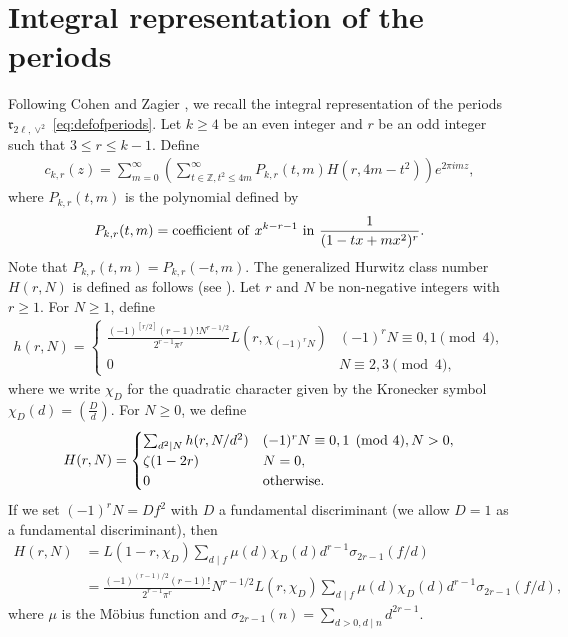 \documentclass[11pt,letterpaper,reqno]{amsart}
\numberwithin{figure}{section}
\numberwithin{table}{section}
\theoremstyle{definition}
\theoremstyle{plain}
\theoremstyle{definition}
\theoremstyle{definition}
\theoremstyle{remark}
\numberwithin{equation}{section}
\theoremstyle{remark}
\begin{document}
\section{Integral representation of the periods}\label{sect:integralrepofperiods}
Following Cohen \cite{Cohen'smodularformC_k} and Zagier \cite{Zagier1977M}, we recall the integral representation of the periods $\mathfrak{r}_{2\ell,\vee^2}$ \eqref{eq:defofperiods}. Let $k\geq4$ be an even integer and $r$ be an odd integer such that $3\leq r\leq k-1$. Define
\begin{align}
    c_{k,r}(z)=\sum_{m=0}^{\infty}\left(\sum_{t\in\mathbb{Z},t^{2}\leq4m}^{\infty}P_{k,r}(t,m)H(r,4m-t^2)\right)e^{2\pi imz},\label{eq:defofc_k,r}
\end{align}
where $P_{k,r}(t,m)$ is the polynomial defined by \cite[p.114]{Zagier1977M}
\begin{align}
    P_{k,r}(t,m)={\rm coefficient~of~}x^{k-r-1}~{\rm in~}\frac{1}{(1-tx+mx^2)^{r}}.
\end{align}
Note that $P_{k,r}(t,m)=P_{k,r}(-t,m)$.  The generalized Hurwitz class number $H(r,N)$ is defined as follows (see \cite[p.272-273]{Cohen'smodularformC_k}).  Let $r$ and $N$ be non-negative integers with $r\geq1$. For $N\geq1$, define
\begin{align}
    h(r,N)=\begin{cases}
        \frac{(-1)^{[r/2]}(r-1)!N^{r-1/2}}{2^{r-1}\pi^r}L(r,\chi_{(-1)^rN}) &(-1)^rN\equiv0,1\pmod 4,\\
        0&N\equiv 2,3\pmod4,
    \end{cases}
\end{align}
where we write $\chi_D$ for the quadratic character given by the Kronecker symbol $\chi_{D}(d)=(\frac{D}{d})$. For $N\geq0$, we define
\begin{align}
    H(r,N)=\begin{cases}
        \sum_{d^2\mid N}h(r,N/d^2)&(-1)^rN\equiv0,1\pmod4, N>0,\\
        \zeta(1-2r)&N=0,\\
        0&{\rm otherwise}.
    \end{cases}
\end{align}
If we set $(-1)^rN=Df^2$ with $D$ a fundamental discriminant (we allow $D=1$ as a fundamental discriminant), then
\begin{align}
    H(r,N)&=L(1-r,\chi_D)\sum_{d\mid f}\mu(d)\chi_D(d)d^{r-1}\sigma_{2r-1}(f/d)\\&=\frac{(-1)^{(r-1)/2}(r-1)!}{2^{r-1}\pi^r}N^{r-1/2}L(r,\chi_D)\sum_{d\mid f}\mu(d)\chi_D(d)d^{r-1}\sigma_{2r-1}(f/d),\label{eq:defofHurwitzclassnumber}
\end{align}
where $\mu$ is the M\"{o}bius function and $\sigma_{2r-1}(n)=\sum_{d>0,d\mid n}d^{2r-1}$.
\end{document}
